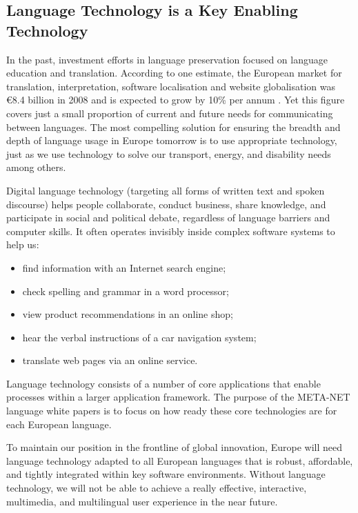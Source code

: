 \begin{multicols}{2}
\subsection{Language Technology is a Key Enabling Technology}

In the past, investment efforts in language preservation focused on language education and translation.
According to one estimate, the European market for translation, interpretation, software localisation and website globalisation was €8.4 billion in 2008 and is expected to grow by 10\% per annum \cite{Meta51}.
Yet this figure covers just a small proportion of current and future needs for communicating between languages.
The most compelling solution for ensuring the breadth and depth of language usage in Europe tomorrow is to use appropriate technology, just as we use technology to solve our transport, energy, and disability needs among others.


Digital language technology (targeting all forms of written text and spoken discourse) helps people collaborate, conduct business, share knowledge, and participate in social and political debate, regardless of language barriers and computer skills.
It often operates invisibly inside complex software systems to help us:

\begin{itemize}
\item  find information with an Internet search engine;
\item  check spelling and grammar in a word processor;
\item  view product recommendations in an online shop;
\item  hear the verbal instructions of a car navigation system;
\item  translate web pages via an online service.
\end{itemize}

Language technology consists of a number of core applications that enable processes within a larger application framework.
The purpose of the META-NET language white papers is to focus on how ready these core technologies are for each European language. 


To maintain our position in the frontline of global innovation, Europe will need language technology adapted to all European languages that is robust, affordable, and tightly integrated within key software environments.
 Without language technology, we will not be able to achieve a really effective, interactive, multimedia, and multilingual user experience in the near future. 


\end{multicols}
